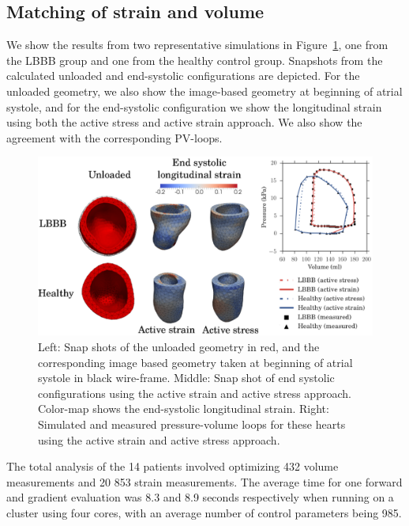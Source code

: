\subsection{Matching of strain and volume}
We show the results from two representative simulations in
Figure~\ref{paper2:fig:generic_result}, one from the LBBB group and one from
the healthy control group. Snapshots from the calculated unloaded and
end-systolic configurations are depicted. For the unloaded
geometry, we also show the image-based geometry at beginning of atrial
systole, and for the end-systolic configuration we show the
longitudinal strain using both the active stress and active strain
approach. We also show the agreement with the corresponding PV-loops.


\begin{figure}[htbp]
  \centering
  \includegraphics[width=\textwidth]{generic_result}
  \caption{Left: Snap shots of the unloaded geometry in red, and the
    corresponding image based geometry taken at beginning of atrial
    systole in black wire-frame. Middle: Snap shot of end systolic
    configurations using the active strain and active stress approach.
    Color-map shows the end-systolic longitudinal strain.
    Right: Simulated and measured pressure-volume loops for
    these hearts using the active strain and active stress approach.}  
  \label{paper2:fig:generic_result}
\end{figure}


The total analysis of the 14 patients involved optimizing 432 volume
measurements and 20 853 strain measurements. The average time for one
forward and gradient evaluation was 8.3 and 8.9 seconds respectively
when running on a cluster using four cores, with an average number of
control parameters being 985.

